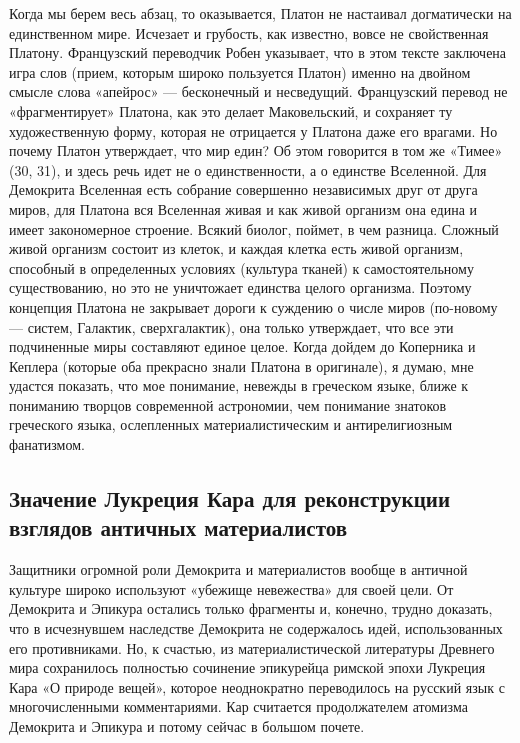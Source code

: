 Когда  мы  берем  весь  абзац, то  оказывается,  Платон  не  настаивал
догматически на единственном мире.  Исчезает и грубость, как известно,
вовсе не свойственная Платону. Французский переводчик Робен указывает,
что  в  этом  тексте  заключена   игра  слов  (прием,  которым  широко
пользуется  Платон)  именно  на  двойном смысле  слова  «апейрос»  ---
бесконечный  и  несведущий.  Французский  перевод  не  «фрагментирует»
Платона, как  это делает  Маковельский, и сохраняет  ту художественную
форму, которая  не отрицается  у Платона даже  его врагами.  Но почему
Платон  утверждает,  что  мир  един?   Об  этом  говорится  в  том  же
«Тимее»  (30,  31),  и  здесь  речь идет  не  о  единственности,  а  о
единстве Вселенной.  Для Демокрита Вселенная есть  собрание совершенно
независимых друг от друга миров, для Платона вся Вселенная живая и как
живой  организм  она  едина  и  имеет  закономерное  строение.  Всякий
биолог,  поймет, в  чем  разница. Сложный  живой  организм состоит  из
клеток, и каждая клетка есть  живой организм, способный в определенных
условиях  (культура  тканей)   к  самостоятельному  существованию,  но
это  не  уничтожает  единства   целого  организма.  Поэтому  концепция
Платона  не  закрывает дороги  к  суждению  о числе  миров  (по-новому
---  систем,  Галактик,  сверхгалактик), она  только  утверждает,  что
все  эти подчиненные  миры составляют  единое целое.  Когда дойдем  до
Коперника и Кеплера (которые оба прекрасно знали Платона в оригинале),
я  думаю,  мне   удастся  показать,  что  мое   понимание,  невежды  в
греческом языке, ближе к пониманию творцов современной астрономии, чем
понимание знатоков греческого  языка, ослепленных материалистическим и
антирелигиозным фанатизмом.

\subsection{Значение Лукреция Кара для реконструкции взглядов античных
материалистов}

Защитники огромной  роли Демокрита  и материалистов вообще  в античной
культуре  широко используют  «убежище невежества»  для своей  цели. От
Демокрита  и  Эпикура остались  только  фрагменты  и, конечно,  трудно
доказать, что в исчезнувшем  наследстве Демокрита не содержалось идей,
использованных его противниками. Но,  к счастью, из материалистической
литературы  Древнего мира  сохранилось полностью  сочинение эпикурейца
римской эпохи  Лукреция Кара  «О природе вещей»,  которое неоднократно
переводилось  на русский  язык  с  многочисленными комментариями.  Кар
считается продолжателем атомизма Демокрита и Эпикура и потому сейчас в
большом почете.

